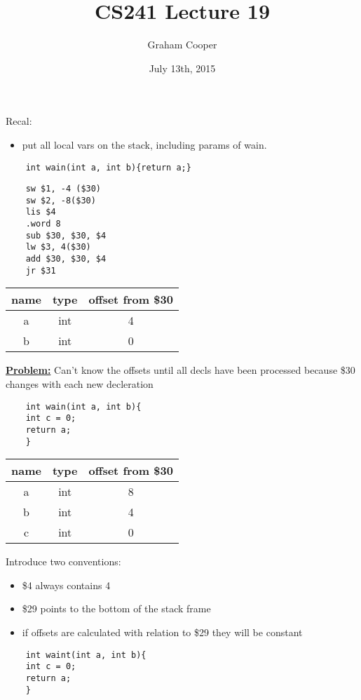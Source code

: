 \documentclass[12pt]{article}
\title{\vspace{-15ex}CS241 Lecture 19\vspace{-1ex}}
\date{July 13th, 2015}
\author{Graham Cooper}
\newcommand{\myt}[1]{\textbf{\underline{#1}}}
\begin{document}
	\maketitle
	Recal:\\
	\begin{itemize}
		\item put all local vars on the stack, including params of wain.
	\end{itemize}
	\begin{verbatim}
	int wain(int a, int b){return a;}
	\end{verbatim}
	
	\begin{verbatim}
	sw $1, -4 ($30)
	sw $2, -8($30)
	lis $4
	.word 8
	sub $30, $30, $4
	lw $3, 4($30)
	add $30, $30, $4
	jr $31
	\end{verbatim}
	
	\begin{tabular}{c | c | c}
		name & type & offset from \$30 \\ \hline
		a & int & 4 \\
		b & int & 0\\
	\end{tabular}
	
	\myt{Problem:} Can't know the offsets until all decls have been processed because \$30 changes with each new decleration\\
	
	\begin{verbatim}
	int wain(int a, int b){
	int c = 0;
	return a;
	}
	\end{verbatim}
	
	\begin{tabular}{c | c | c}
		name & type & offset from \$30 \\ \hline
		a & int & 8 \\
		b & int & 4 \\
		c & int & 0 \\
	\end{tabular}
	
	Introduce two conventions:\\
	\begin{itemize}
		\item \$4 always contains 4
		\item \$29 points to the bottom of the stack frame
		\item if offsets are calculated with relation to \$29 they will be constant
	\end{itemize}
	
	\begin{verbatim}
	int waint(int a, int b){
	int c = 0;
	return a;
	}
	\end{verbatim}
	
\end{document}
